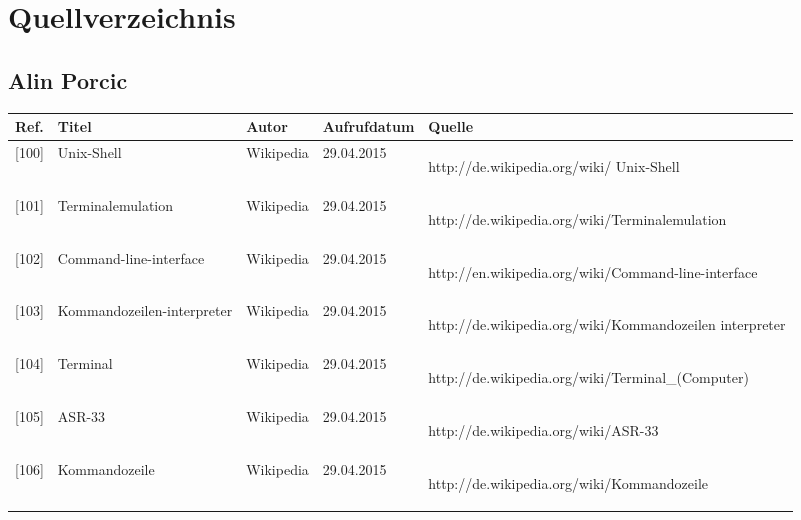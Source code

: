\documentclass[12pt,a4paper]{report}
\begin{document}
\begin{onehalfspace}
\begin{center}
\begin{tabular}{|l|c|l|}
\end{tabular}
\end{center}

\part{Quellverzeichnis}

\chapter{Alin Porcic}

\begin{singlespace}
\begin{tabular}{| m{7mm} | m{40mm} | m{20mm} | m{27mm} | m{65mm} |}
\hline
\textbf{Ref.} & \textbf{Titel} & \textbf{Autor} & \textbf{Aufrufdatum} & \textbf{Quelle}\\ \hline \small
{[}100{]} & Unix-Shell & Wikipedia & 29.04.2015 & \begin{scriptsize}http://de.wikipedia.org/wiki/ Unix-Shell\end{scriptsize}\\
{[}101{]} & Terminalemulation & Wikipedia & 29.04.2015 & \begin{scriptsize}http://de.wikipedia.org/wiki/Terminalemulation\end{scriptsize}\\
{[}102{]} & Command-line-interface & Wikipedia & 29.04.2015 & \begin{scriptsize}http://en.wikipedia.org/wiki/Command-line-interface\end{scriptsize}\\
{[}103{]} & Kommandozeilen-interpreter & Wikipedia & 29.04.2015 & \begin{scriptsize}http://de.wikipedia.org/wiki/Kommandozeilen interpreter\end{scriptsize}\\
{[}104{]} & Terminal & Wikipedia & 29.04.2015 & \begin{scriptsize}http://de.wikipedia.org/wiki/Terminal\_(Computer)\end{scriptsize}\\
{[}105{]} & ASR-33 & Wikipedia & 29.04.2015 & \begin{scriptsize}http://de.wikipedia.org/wiki/ASR-33\end{scriptsize}\\
{[}106{]} & Kommandozeile &  Wikipedia & 29.04.2015 & \begin{scriptsize}http://de.wikipedia.org/wiki/Kommandozeile\end{scriptsize}\\


\end{tabular}
\end{singlespace}
\end{onehalfspace}
\end{document}
